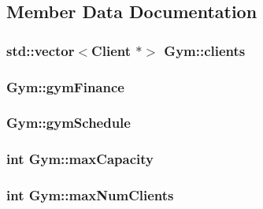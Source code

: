 \subsection{Member Data Documentation}
\subsubsection[{\texorpdfstring{clients}{clients}}]{\setlength{\rightskip}{0pt plus 5cm}std\+::vector$<${\bf Client} $\ast$$>$ Gym\+::clients\hspace{0.3cm}{\ttfamily [private]}}\hypertarget{classGym_a30a9153e0d241801fdc55c3ef3008767}{}\label{classGym_a30a9153e0d241801fdc55c3ef3008767}
\subsubsection[{\texorpdfstring{gym\+Finance}{gymFinance}}]{ Gym\+::gym\+Finance\hspace{0.3cm}{\ttfamily [private]}}\hypertarget{classGym_a3cb79db88f1d6463006e3db741b3992f}{}\label{classGym_a3cb79db88f1d6463006e3db741b3992f}
\subsubsection[{\texorpdfstring{gym\+Schedule}{gymSchedule}}]{ Gym\+::gym\+Schedule\hspace{0.3cm}{\ttfamily [private]}}\hypertarget{classGym_ad48bb78d56dcd88bb4f9f283084a9f37}{}\label{classGym_ad48bb78d56dcd88bb4f9f283084a9f37}
\subsubsection[{\texorpdfstring{max\+Capacity}{maxCapacity}}]{\setlength{\rightskip}{0pt plus 5cm}int Gym\+::max\+Capacity\hspace{0.3cm}{\ttfamily [private]}}\hypertarget{classGym_aa44c525d930ea2ef376d486927caf027}{}\label{classGym_aa44c525d930ea2ef376d486927caf027}
\subsubsection[{\texorpdfstring{max\+Num\+Clients}{maxNumClients}}]{\setlength{\rightskip}{0pt plus 5cm}int Gym\+::max\+Num\+Clients\hspace{0.3cm}{\ttfamily [private]}}\hypertarget{classGym_ae0ba7b88dfa18bf69a600dc6bbc437c0}{}\label{classGym_ae0ba7b88dfa18bf69a600dc6bbc437c0}
